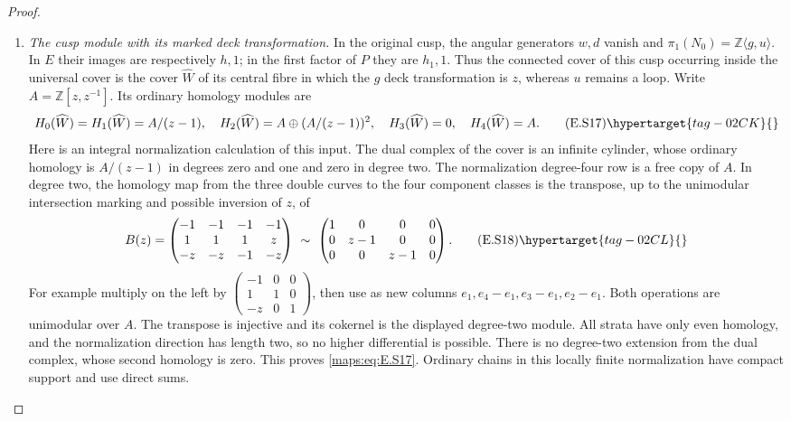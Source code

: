 \begin{proof}
\begin{enumerate}[label={$\langle1\rangle$\arabic*.},leftmargin=*]
\item \emph{The cusp module with its marked deck transformation.}
In the original cusp, the angular generators $w,d$ vanish and
$\pi_1(N_0)=\mathbb Z\langle g,u\rangle$. In $E$ their images
are respectively $h,1$; in the first factor of $P$ they are
$h_1,1$. Thus the connected cover of this cusp occurring inside
the universal cover is the cover $\widehat W$ of its central
fibre in which the $g$ deck transformation is $z$, whereas $u$
remains a loop. Write $A=\mathbb Z[z,z^{-1}]$.
Its ordinary homology modules are
\[
 H_0(\widehat W)=H_1(\widehat W)=A/(z-1),\quad
 H_2(\widehat W)=A\oplus(A/(z-1))^2,
 \quad H_3(\widehat W)=0,\quad H_4(\widehat W)=A.
 \tag{E.S17}\hypertarget{tag-02CK}{}\label{maps:eq:E.S17}
\]
Here is an integral normalization calculation of this input.
The dual complex of the cover is an infinite cylinder, whose
ordinary homology is $A/(z-1)$ in degrees zero and one and zero
in degree two. The normalization degree-four row is a free
copy of $A$. In degree two, the homology map from the three
double curves to the four component classes is the transpose,
up to the unimodular intersection marking and possible inversion
of $z$, of
\[
 B(z)=\begin{pmatrix}
 -1&-1&-1&-1\\ 1&1&1&z\\-z&-z&-1&-z
 \end{pmatrix}
 \ \sim\
 \begin{pmatrix}1&0&0&0\\0&z-1&0&0\\0&0&z-1&0\end{pmatrix}.
 \tag{E.S18}\hypertarget{tag-02CL}{}\label{maps:eq:E.S18}
\]
For example multiply on the left by
$\left(\begin{smallmatrix}-1&0&0\\1&1&0\\-z&0&1\end{smallmatrix}\right)$,
then use as new columns $e_1,e_4-e_1,e_3-e_1,e_2-e_1$.
Both operations are unimodular over $A$. The transpose is
injective and its cokernel is the displayed degree-two module.
All strata have only even homology, and the normalization
direction has length two, so no higher differential is possible.
There is no degree-two extension from the dual complex, whose
second homology is zero. This proves \eqref{maps:eq:E.S17}. Ordinary chains
in this locally finite normalization have compact support and
use direct sums.


\end{enumerate}
\end{proof}
